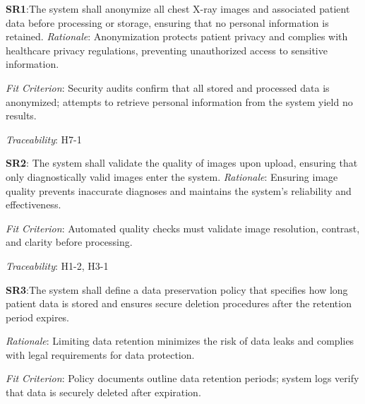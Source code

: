 \documentclass{article}
\begin{document}
\hspace{0.5cm}\textbf{SR1}:\hypertarget{SR1}{The system shall anonymize all chest X-ray images and associated patient data before processing or storage, ensuring that no personal information is retained.}
\vspace{0.2cm}
\emph{Rationale}: Anonymization protects patient privacy and complies with healthcare privacy regulations, preventing unauthorized access to sensitive information.

\vspace{0.2cm}

\emph{Fit Criterion}: Security audits confirm that all stored and processed data is anonymized; attempts to retrieve personal information from the system yield no results.

\vspace{0.2cm}

\emph{Traceability}: H7-1

\vspace{0.5cm}

\textbf{SR2}: \hypertarget{SR2}{The system shall validate the quality of images upon upload, ensuring that only diagnostically valid images enter the system.}
\vspace{0.2cm}
\emph{Rationale}: Ensuring image quality prevents inaccurate diagnoses and maintains the system's reliability and effectiveness.

\vspace{0.2cm}

\emph{Fit Criterion}: Automated quality checks must validate image resolution, contrast, and clarity before processing.

\vspace{0.2cm}

\emph{Traceability}: H1-2, H3-1

\vspace{0.5cm}

\textbf{SR3}:\hypertarget{SR3}{The system shall define a data preservation policy that specifies how long patient data is stored and ensures secure deletion procedures after the retention period expires.}
\vspace{0.2cm}

\emph{Rationale}: Limiting data retention minimizes the risk of data leaks and complies with legal requirements for data protection.

\vspace{0.2cm}

\emph{Fit Criterion}: Policy documents outline data retention periods; system logs verify that data is securely deleted after expiration.
\end{document}
